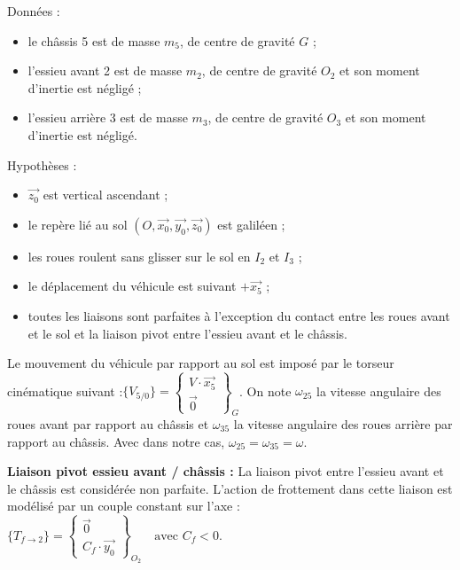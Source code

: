 Données :
\begin{itemize}
  \item le châssis 5 est de masse $m_5$, de centre de gravité $G$ ;
  \item l'essieu avant 2 est de masse $m_2$, de centre de gravité $O_2$ et son moment d'inertie est négligé ;
  \item l'essieu arrière 3 est de masse $m_3$, de centre de gravité $O_3$ et son moment d'inertie est négligé.
\end{itemize}

Hypothèses :
\begin{itemize}
  \item $\overrightarrow{z_0}$ est vertical ascendant ;
  \item le repère lié au sol $(O,\overrightarrow{x_0},\overrightarrow{y_0},\overrightarrow{z_0})$ est galiléen ;
  \item les roues roulent sans glisser sur le sol en $I_2$ et $I_3$ ;
  \item le déplacement du véhicule est suivant $+\overrightarrow{x_5}$ ;
  \item toutes les liaisons sont parfaites à l'exception du contact entre les roues avant et le sol et la liaison pivot entre l'essieu avant et le châssis.
\end{itemize}

Le mouvement du véhicule par rapport au sol est imposé par le torseur cinématique suivant :$\{V_{5/0}\} = \left\{\begin{array}{c} V\cdot\overrightarrow{x_5} \\ \overrightarrow{0} \end{array}\right\}_{G}$. On note $\omega_{25}$ la vitesse angulaire des roues avant par rapport au châssis et $\omega_{35}$ la vitesse angulaire des roues arrière par rapport au châssis. Avec dans notre cas, $\omega_{25} = \omega_{35} = \omega$.

\textbf{Liaison pivot essieu avant / châssis :} La liaison pivot entre l'essieu avant et le châssis est considérée non parfaite. L'action de frottement dans cette liaison est modélisé par un couple constant sur l'axe :$\{T_{f\to 2}\} = \left\{\begin{array}{c} \overrightarrow{0} \\ C_f\cdot\overrightarrow{y_0} \end{array}\right\}_{O_2} \quad \text{avec } C_f < 0.
$

